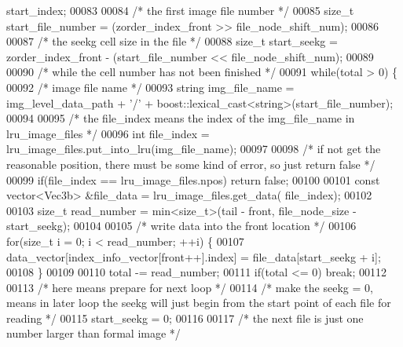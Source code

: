 \begin{DoxyCode}
      start\_index;
00083 
00084         \textcolor{comment}{/* the first image file number */}
00085         \textcolor{keywordtype}{size\_t} start\_file\_number = (zorder\_index\_front >> file\_node\_shift\_num);
00086 
00087         \textcolor{comment}{/* the seekg cell size in the file */}
00088         \textcolor{keywordtype}{size\_t} start\_seekg = zorder\_index\_front - (start\_file\_number << 
      file\_node\_shift\_num);
00089 
00090         \textcolor{comment}{/* while the cell number has not been finished */}
00091         \textcolor{keywordflow}{while}(total > 0) \{
00092                 \textcolor{comment}{/* image file name */}
00093                 \textcolor{keywordtype}{string} img\_file\_name = img\_level\_data\_path + \textcolor{charliteral}{'/'} + 
      boost::lexical\_cast<\textcolor{keywordtype}{string}>(start\_file\_number);
00094 
00095                 \textcolor{comment}{/* the file\_index means the index of the img\_file\_name in
       lru\_image\_files */}
00096                 \textcolor{keywordtype}{int} file\_index = lru\_image\_files.put\_into\_lru(img\_file\_name);
00097 
00098                 \textcolor{comment}{/* if not get the reasonable position, there must be some kind
       of error, so just return false */}
00099                 \textcolor{keywordflow}{if}(file\_index == lru\_image\_files.npos)  \textcolor{keywordflow}{return} \textcolor{keyword}{false};
00100 
00101                 \textcolor{keyword}{const} vector<Vec3b> &file\_data = lru\_image\_files.get\_data(
      file\_index);
00102 
00103                 \textcolor{keywordtype}{size\_t} read\_number = min<size\_t>(tail - front, file\_node\_size -
       start\_seekg);
00104 
00105                 \textcolor{comment}{/* write data into the front location */}
00106                 \textcolor{keywordflow}{for}(\textcolor{keywordtype}{size\_t} i = 0; i < read\_number; ++i) \{
00107                         data\_vector[index\_info\_vector[front++].index] = 
      file\_data[start\_seekg + i];
00108                 \}
00109 
00110                 total -= read\_number;
00111                 \textcolor{keywordflow}{if}(total <= 0)  \textcolor{keywordflow}{break};
00112 
00113                 \textcolor{comment}{/* here means prepare for next loop */}
00114                 \textcolor{comment}{/* make the seekg = 0, means in later loop the seekg will just
       begin from the start point of each file for reading */}
00115                 start\_seekg = 0;
00116 
00117                 \textcolor{comment}{/* the next file is just one number larger than formal image */}

\end{DoxyCode}

